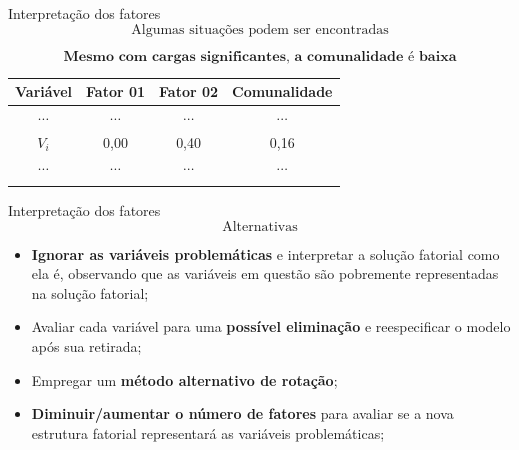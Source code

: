 \documentclass[
  ignorenonframetext,
  aspectratio=169,
]{beamer}
\providecommand{\tightlist}{%
  \setlength{\itemsep}{0pt}\setlength{\parskip}{0pt}}
\begin{document}
\begin{frame}{Interpretação dos fatores}
\label{interpretauxe7uxe3o-dos-fatores-4}
\[\text{Algumas situações podem ser encontradas}\]

\[\textbf{Mesmo com cargas significantes, a comunalidade é baixa}\]

\begin{longtable}[]{@{}cccc@{}}
\toprule\noalign{}
\textbf{Variável} & \textbf{Fator 01} & \textbf{Fator 02} &
\textbf{Comunalidade} \\
\midrule\noalign{}
\endhead
\(\cdots\) & \(\cdots\) & \(\cdots\) & \(\cdots\) \\
\(V_i\) & 0,00 & 0,40 & 0,16 \\
\(\cdots\) & \(\cdots\) & \(\cdots\) & \(\cdots\) \\
\bottomrule\noalign{}
\end{longtable}
\end{frame}

\begin{frame}{Interpretação dos fatores}
\label{interpretauxe7uxe3o-dos-fatores-5}
\[\text{Alternativas}\]

\begin{itemize}
\tightlist
\item
  \textbf{Ignorar as variáveis problemáticas} e interpretar a solução
  fatorial como ela é, observando que as variáveis em questão são
  pobremente representadas na solução fatorial;
\end{itemize}

\vspace{0.3cm}

\pause

\begin{itemize}
\tightlist
\item
  Avaliar cada variável para uma \textbf{possível eliminação} e
  reespecificar o modelo após sua retirada;
\end{itemize}

\vspace{0.3cm}

\pause

\begin{itemize}
\tightlist
\item
  Empregar um \textbf{método alternativo de rotação};
\end{itemize}

\vspace{0.3cm}

\pause

\begin{itemize}
\tightlist
\item
  \textbf{Diminuir/aumentar o número de fatores} para avaliar se a nova
  estrutura fatorial representará as variáveis problemáticas;
\end{itemize}
\end{frame}
\end{document}
